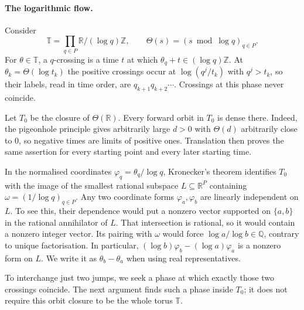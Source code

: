 \documentclass[11pt]{article}
\theoremstyle{remark}
\theoremstyle{plain}
\begin{document}
\paragraph{The logarithmic flow.}\label{long269:sec:flow}
Consider
\[
 \mathbb T=\prod_{q\in P}\mathbb R/(\log q)\mathbb Z,
 \qquad \Theta(s)=(s\bmod\log q)_{q\in P}.
\]
For $\theta\in\mathbb T$, a $q$-crossing is a time $t$ at which
$\theta_q+t\in(\log q)\mathbb Z$. At
$\theta_k=\Theta(\log t_k)$ the positive crossings occur at
$\log(q^j/t_k)$ with $q^j>t_k$, so their labels, read in time order, are
$q_{k+1}q_{k+2}\cdots$. Crossings at this phase never coincide.

Let $T_0$ be the closure of $\Theta(\mathbb R)$. Every forward orbit in
$T_0$ is dense there. Indeed, the pigeonhole principle gives arbitrarily
large $d>0$ with $\Theta(d)$ arbitrarily close to $0$, so negative times
are limits of positive ones. Translation then proves the same assertion
for every starting point and every later starting time.

In the normalised coordinates $\varphi_q=\theta_q/\log q$, Kronecker's
theorem identifies $T_0$ with the image of the smallest rational subspace
$L\subseteq\mathbb R^P$ containing $\omega=(1/\log q)_{q\in P}$.
Any two coordinate forms $\varphi_a,\varphi_b$ are linearly independent on
$L$. To see this, their dependence would put a nonzero vector supported
on $\{a,b\}$ in the rational annihilator of $L$. That intersection is
rational, so it would contain a nonzero integer vector. Its pairing with
$\omega$ would force $\log a/\log b\in\mathbb Q$, contrary to unique
factorisation. In particular,
$(\log b)\varphi_b-(\log a)\varphi_a$ is a nonzero form on $L$.
We write it as $\theta_b-\theta_a$ when using real representatives.

To interchange just two jumps, we seek a phase at which exactly those
two crossings coincide. The next argument finds such a phase inside
$T_0$; it does not require this orbit closure to be the whole torus
$\mathbb T$.
\end{document}
